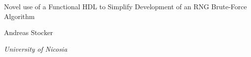 \documentclass{article}
\begin{document}
    \begin{center}
    \end{center}
    
    \addvspace{20mm}
        
    \begin{center}
        \huge Novel use of a Functional HDL to Simplify Development of an RNG Brute-Force Algorithm
    \end{center}
    
    \begin{center}
    \end{center}
       
    \begin{center}
        \large Andreas Stocker
    \end{center}
    
    \begin{center}
        \small \emph {University of Nicosia}
    \end{center}

    \addvspace{15mm}
\end{document}

